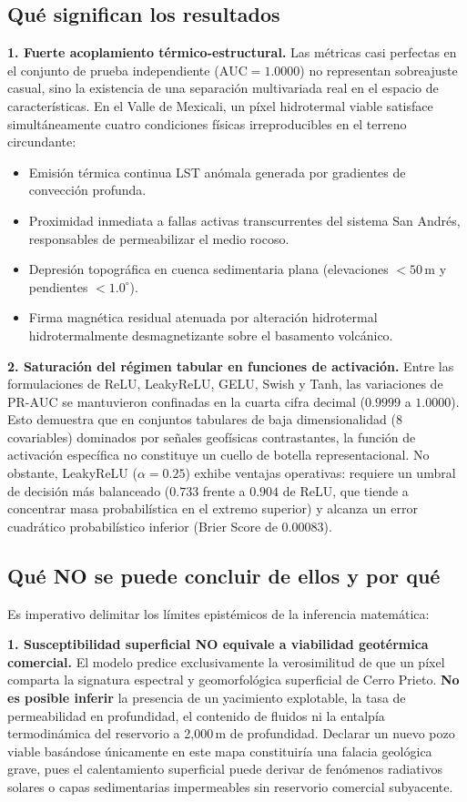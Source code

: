 \documentclass[10pt,twocolumn,letterpaper]{article}
\newcommand{\AUC}{\mathrm{AUC}}
\newcommand{\PRAUC}{\mathrm{PR\text{-}AUC}}
\begin{document}
\subsection{Qué significan los resultados}
\textbf{1. Fuerte acoplamiento térmico-estructural.} Las métricas casi perfectas en el conjunto de prueba independiente ($\AUC=1.0000$) no representan sobreajuste casual, sino la existencia de una separación multivariada real en el espacio de características. En el Valle de Mexicali, un píxel hidrotermal viable satisface simultáneamente cuatro condiciones físicas irreproducibles en el terreno circundante:
\begin{itemize}[leftmargin=1.2em]
  \item Emisión térmica continua LST anómala generada por gradientes de convección profunda.
  \item Proximidad inmediata a fallas activas transcurrentes del sistema San Andrés, responsables de permeabilizar el medio rocoso.
  \item Depresión topográfica en cuenca sedimentaria plana (elevaciones $<50$\,m y pendientes $<1.0^\circ$).
  \item Firma magnética residual atenuada por alteración hidrotermal hidrotermalmente desmagnetizante sobre el basamento volcánico.
\end{itemize}

\textbf{2. Saturación del régimen tabular en funciones de activación.} Entre las formulaciones de ReLU, LeakyReLU, GELU, Swish y Tanh, las variaciones de $\PRAUC$ se mantuvieron confinadas en la cuarta cifra decimal ($0.9999$ a $1.0000$). Esto demuestra que en conjuntos tabulares de baja dimensionalidad (8 covariables) dominados por señales geofísicas contrastantes, la función de activación específica no constituye un cuello de botella representacional. No obstante, LeakyReLU ($\alpha=0.25$) exhibe ventajas operativas: requiere un umbral de decisión más balanceado ($0.733$ frente a $0.904$ de ReLU, que tiende a concentrar masa probabilística en el extremo superior) y alcanza un error cuadrático probabilístico inferior (Brier Score de $0.00083$).

\subsection{Qué NO se puede concluir de ellos y por qué}
Es imperativo delimitar los límites epistémicos de la inferencia matemática:

\textbf{1. Susceptibilidad superficial NO equivale a viabilidad geotérmica comercial.}
El modelo predice exclusivamente la verosimilitud de que un píxel comparta la signatura espectral y geomorfológica superficial de Cerro Prieto. \textbf{No es posible inferir} la presencia de un yacimiento explotable, la tasa de permeabilidad en profundidad, el contenido de fluidos ni la entalpía termodinámica del reservorio a 2{,}000\,m de profundidad. Declarar un nuevo pozo viable basándose únicamente en este mapa constituiría una falacia geológica grave, pues el calentamiento superficial puede derivar de fenómenos radiativos solares o capas sedimentarias impermeables sin reservorio comercial subyacente.
\end{document}
